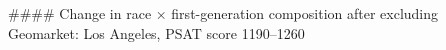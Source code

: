 #### Change in race × first-generation composition after excluding Geomarket: Los Angeles, PSAT score 1190–1260
